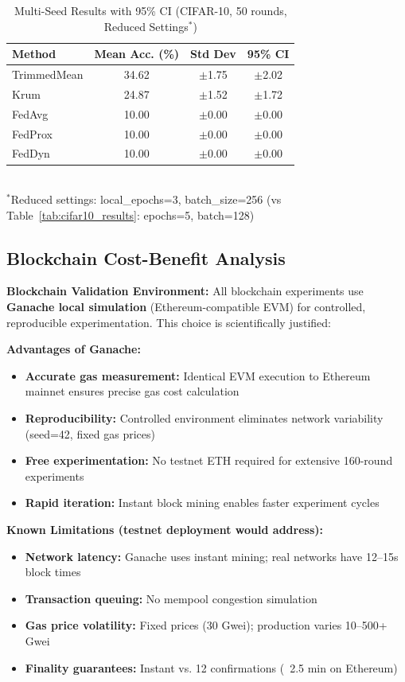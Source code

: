 \documentclass[12pt,a4paper,onecolumn]{article}
\begin{document}
\begin{table}[t]
\caption{Multi-Seed Results with 95\% CI (CIFAR-10, 50 rounds, Reduced Settings$^*$)}
\label{tab:multiseed_ci}
\centering
\begin{tabular}{lccc}
\toprule
\textbf{Method} & \textbf{Mean Acc. (\%)} & \textbf{Std Dev} & \textbf{95\% CI} \\
\midrule
TrimmedMean & 34.62 & $\pm$1.75 & $\pm$2.02 \\
Krum & 24.87 & $\pm$1.52 & $\pm$1.72 \\
FedAvg & 10.00 & $\pm$0.00 & $\pm$0.00 \\
FedProx & 10.00 & $\pm$0.00 & $\pm$0.00 \\
FedDyn & 10.00 & $\pm$0.00 & $\pm$0.00 \\
\bottomrule
\end{tabular}
\\[0.1cm]
\small $^*$Reduced settings: local\_epochs=3, batch\_size=256 (vs Table~\ref{tab:cifar10_results}: epochs=5, batch=128)
\end{table}

\subsection{Blockchain Cost-Benefit Analysis}

\textbf{Blockchain Validation Environment:} All blockchain experiments use \textbf{Ganache local simulation} (Ethereum-compatible EVM) for controlled, reproducible experimentation. This choice is scientifically justified:

\textbf{Advantages of Ganache:}
\begin{itemize}
    \item \textbf{Accurate gas measurement:} Identical EVM execution to Ethereum mainnet ensures precise gas cost calculation
    \item \textbf{Reproducibility:} Controlled environment eliminates network variability (seed=42, fixed gas prices)
    \item \textbf{Free experimentation:} No testnet ETH required for extensive 160-round experiments
    \item \textbf{Rapid iteration:} Instant block mining enables faster experiment cycles
\end{itemize}

\textbf{Known Limitations (testnet deployment would address):}
\begin{itemize}
    \item \textbf{Network latency:} Ganache uses instant mining; real networks have 12--15s block times
    \item \textbf{Transaction queuing:} No mempool congestion simulation
    \item \textbf{Gas price volatility:} Fixed prices (30 Gwei); production varies 10--500+ Gwei
    \item \textbf{Finality guarantees:} Instant vs. 12 confirmations (~2.5 min on Ethereum)
\end{itemize}
\end{document}
